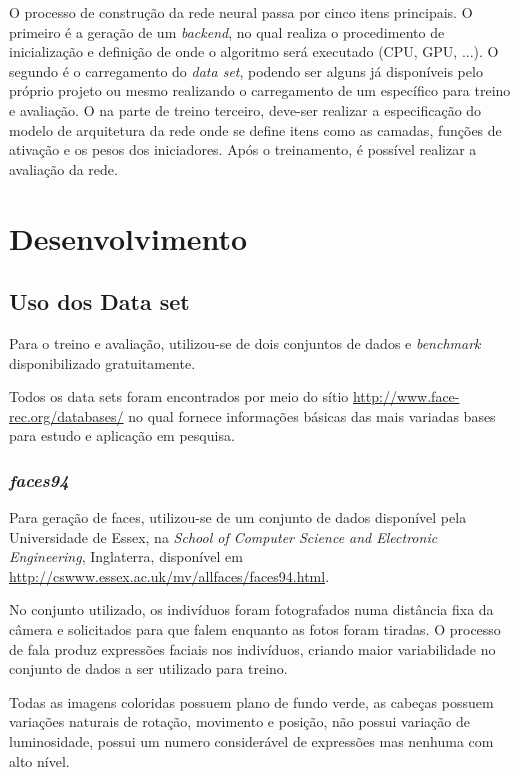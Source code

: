 \documentclass[10pt, conference]{IEEEtran}
\begin{document}
		O processo de construção da rede neural passa por cinco itens principais. O primeiro é a geração de um \textit{backend}, no qual realiza o procedimento de inicialização e definição de onde o algoritmo será executado (CPU, GPU, ...). O segundo é o carregamento do \textit{data set}, podendo ser alguns já disponíveis pelo próprio projeto ou mesmo realizando o carregamento de um específico para treino e avaliação. O na parte de treino terceiro, deve-ser realizar a especificação do modelo de arquitetura da rede onde se define itens como as camadas, funções de ativação e os pesos dos iniciadores. Após o treinamento, é possível realizar a avaliação da rede.


\section{Desenvolvimento} \label{sec:desenvolvimento}

	\subsection{Uso dos Data set}
		Para o treino e avaliação, utilizou-se de dois conjuntos de dados e \textit{benchmark} disponibilizado gratuitamente.

		Todos os data sets foram encontrados por meio do sítio \url{http://www.face-rec.org/databases/} no qual fornece informações básicas das mais variadas bases para estudo e aplicação em pesquisa.

		\subsubsection{\textit{faces94}} \label{sec:94}
			Para geração de faces, utilizou-se de um conjunto de dados disponível pela Universidade de Essex, na \textit{School of Computer Science and Electronic Engineering}, Inglaterra, disponível em \url{http://cswww.essex.ac.uk/mv/allfaces/faces94.html}.

			No conjunto utilizado, os indivíduos foram fotografados numa distância fixa da câmera e solicitados para que falem enquanto as fotos foram tiradas. O processo de fala produz expressões faciais nos indivíduos, criando maior variabilidade no conjunto de dados a ser utilizado para treino.

			Todas as imagens coloridas possuem plano de fundo verde, as cabeças possuem variações naturais de rotação, movimento e posição, não possui variação de luminosidade, possui um numero considerável de expressões mas nenhuma com alto nível.
\end{document}
